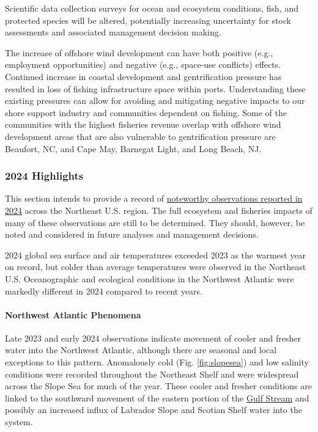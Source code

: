 \documentclass[
  10pt,
]{article}
\begin{document}
Scientific data collection surveys for ocean and ecosystem conditions, fish, and protected species will be altered, potentially increasing uncertainty for stock assessments and associated management decision making.

The increase of offshore wind development can have both positive (e.g., employment opportunities) and negative (e.g., space-use conflicts) effects. Continued increase in coastal development and gentrification pressure has resulted in loss of fishing infrastructure space within ports. Understanding these existing pressures can allow for avoiding and mitigating negative impacts to our shore support industry and communities dependent on fishing. Some of the communities with the highest fisheries revenue overlap with offshore wind development areas that are also vulnerable to gentrification pressure are Beaufort, NC, and Cape May, Barnegat Light, and Long Beach, NJ.

\newpage

\subsubsection{2024 Highlights}\label{highlights}

This section intends to provide a record of \href{https://noaa-edab.github.io/catalog/observation_synthesis_2024.html}{noteworthy observations reported in 2024} across the Northeast U.S. region. The full ecosystem and fisheries impacts of many of these observations are still to be determined. They should, however, be noted and considered in future analyses and management decisions.

2024 global sea surface and air temperatures exceeded 2023 as the warmest year on record, but colder than average temperatures were observed in the Northeast U.S. Oceanographic and ecological conditions in the Northwest Atlantic were markedly different in 2024 compared to recent years.

\paragraph{Northwest Atlantic Phenomena}\label{northwest-atlantic-phenomena}

Late 2023 and early 2024 observations indicate movement of cooler and fresher water into the Northwest Atlantic, although there are seasonal and local exceptions to this pattern. Anomalously cold (Fig. \ref{fig:slopesea}) and low salinity conditions were recorded throughout the Northeast Shelf and were widespread across the Slope Sea for much of the year. These cooler and fresher conditions are linked to the southward movement of the eastern portion of the \href{https://noaa-edab.github.io/catalog/gsi.html}{Gulf Stream} and possibly an increased influx of Labrador Slope and Scotian Shelf water into the system.
\end{document}
